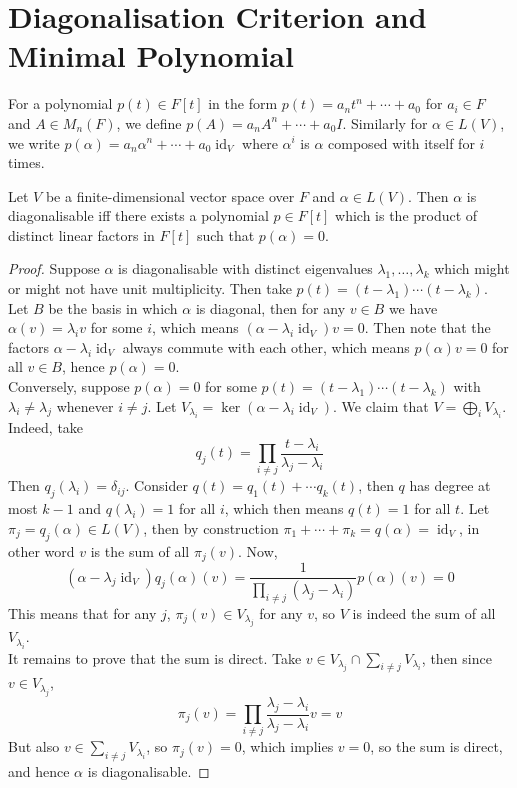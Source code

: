 \section{Diagonalisation Criterion and Minimal Polynomial}
For a polynomial $p(t)\in F[t]$ in the form $p(t)=a_nt^n+\cdots+a_0$ for $a_i\in F$ and $A\in M_n(F)$, we define $p(A)=a_nA^n+\cdots +a_0I$.
Similarly for $\alpha\in L(V)$, we write $p(\alpha)=a_n\alpha^n+\cdots+a_0\operatorname{id}_V$ where $\alpha^i$ is $\alpha$ composed with itself for $i$ times.
\begin{theorem}\label{distinct_linear_diag}
    Let $V$ be a finite-dimensional vector space over $F$ and $\alpha\in L(V)$.
    Then $\alpha$ is diagonalisable iff there exists a polynomial $p\in F[t]$ which is the product of distinct linear factors in $F[t]$ such that $p(\alpha)=0$.
\end{theorem}
\begin{proof}
    Suppose $\alpha$ is diagonalisable with distinct eigenvalues $\lambda_1,\ldots,\lambda_k$ which might or might not have unit multiplicity.
    Then take $p(t)=(t-\lambda_1)\cdots (t-\lambda_k)$.
    Let $B$ be the basis in which $\alpha$ is diagonal, then for any $v\in B$ we have $\alpha(v)=\lambda_iv$ for some $i$, which means $(\alpha-\lambda_i\operatorname{id}_V)v=0$.
    Then note that the factors $\alpha-\lambda_i\operatorname{id}_V$ always commute with each other, which means $p(\alpha)v=0$ for all $v\in B$, hence $p(\alpha)=0$.\\
    Conversely, suppose $p(\alpha)=0$ for some $p(t)=(t-\lambda_1)\cdots (t-\lambda_k)$ with $\lambda_i\neq\lambda_j$ whenever $i\neq j$.
    Let $V_{\lambda_i}=\ker(\alpha-\lambda_i\operatorname{id}_V)$.
    We claim that $V=\bigoplus_iV_{\lambda_i}$.
    Indeed, take
    $$q_j(t)=\prod_{i\neq j}\frac{t-\lambda_i}{\lambda_j-\lambda_i}$$
    Then $q_j(\lambda_i)=\delta_{ij}$.
    Consider $q(t)=q_1(t)+\cdots q_k(t)$, then $q$ has degree at most $k-1$ and $q(\lambda_i)=1$ for all $i$, which then means $q(t)=1$ for all $t$.
    Let $\pi_j=q_j(\alpha)\in L(V)$, then by construction $\pi_1+\cdots +\pi_k=q(\alpha)=\operatorname{id}_V$, in other word $v$ is the sum of all $\pi_j(v)$.
    Now,
    $$(\alpha-\lambda_j\operatorname{id}_V)q_j(\alpha)(v)=\frac{1}{\prod_{i\neq j}(\lambda_j-\lambda_i)}p(\alpha)(v)=0$$
    This means that for any $j$, $\pi_j(v)\in V_{\lambda_j}$ for any $v$, so $V$ is indeed the sum of all $V_{\lambda_i}$.\\
    It remains to prove that the sum is direct.
    Take $v\in V_{\lambda_j}\cap\sum_{i\neq j}V_{\lambda_i}$, then since $v\in V_{\lambda_j}$,
    $$\pi_j(v)=\prod_{i\neq j}\frac{\lambda_j-\lambda_i}{\lambda_j-\lambda_i}v=v$$
    But also $v\in \sum_{i\neq j}V_{\lambda_i}$, so $\pi_j(v)=0$, which implies $v=0$, so the sum is direct, and hence $\alpha$ is diagonalisable.
\end{proof}

